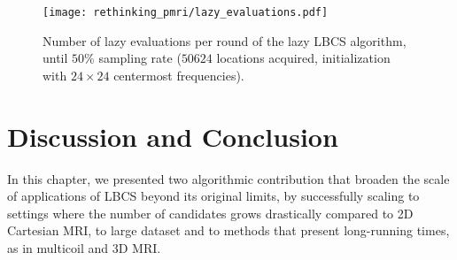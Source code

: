    \begin{figure}[!t]
        \centering
        \texttt{[image: rethinking\_pmri/lazy\_evaluations.pdf]}
        \caption{Number of lazy evaluations per round of the lazy LBCS algorithm, until $50\%$ sampling rate ($50624$ locations acquired, initialization with $24\times 24$ centermost frequencies).}\label{fig:lazy_eval}
    \end{figure}
    
    \section{Discussion and Conclusion}\label{s:lbcs_discussion}
    In this chapter, we presented two algorithmic contribution that broaden the scale of applications of LBCS \citep{gozcu2019rethinking} beyond its original limits, by successfully scaling to settings where the number of candidates grows drastically compared to 2D Cartesian MRI, to large dataset and to methods that present long-running times, as in multicoil and 3D MRI. 



